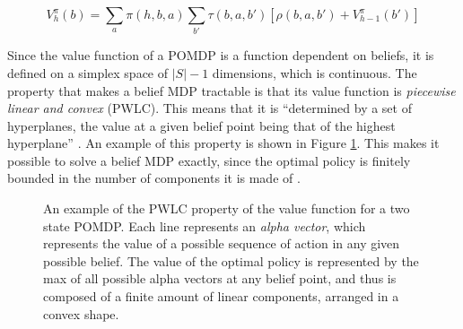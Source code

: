 \begin{equation}
 V^{\pi}_{h}(b) = \sum_a \pi(h, b, a) \sum_{b'} \tau(b, a, b') \left [ \rho(b, a, b') +
V^{\pi}_{h-1}(b') \right ]
\end{equation}

Since the value function of a POMDP is a function dependent on beliefs, it is defined on a simplex
space of $|S|-1$ dimensions, which is continuous. The property that makes a belief MDP tractable is
that its value function is \textit{piecewise linear and convex} (PWLC). This means that it is
``determined by a set of hyperplanes, the value at a given belief point being that of the highest
hyperplane'' \cite{cit:rpomdp}. An example of this property is shown in Figure \ref{pwlcpic}. This
makes it possible to solve a belief MDP exactly, since the optimal policy is finitely bounded in the
number of components it is made of \cite{cit:pomdp}.

\begin{figure}[ht]
\begin{center}
\end{center}
\caption{An example of the PWLC property of the value function for a two state POMDP. Each line
represents an \textit{alpha vector}, which represents the value of a possible sequence of action in
any given possible belief. The value of the optimal policy is represented by the max of all possible
alpha vectors at any belief point, and thus is composed of a finite amount of linear components,
arranged in a convex shape.}
\label{pwlcpic}
\end{figure}

